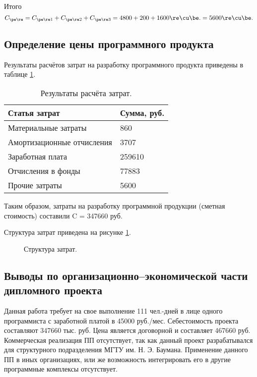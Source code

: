 Итого
\begin{equation*}
    C_{\pe\re} = C_{\pe\re 1} +  C_{\pe\re 2} + C_{\pe\re 3} = 4800 + 200 + 1600 \re\cu\be. = 5600 \re\cu\be.
\end{equation*}

\subsection{Определение цены программного продукта}
Результаты расчётов затрат на разработку программного продукта приведены в таблице \ref{tab:cost}.

\begin{table}[H]
    \caption{\label{tab:cost}Результаты расчёта затрат.}
    \begin{tabular}[H]{|l|l|}
        \hline
        Статья затрат & Сумма, руб.\\
        \hline
        Материальные затраты & 860\\
        \hline
        Амортизационные отчисления & 3707\\
        \hline
        Заработная плата & 259610\\
        \hline
        Отчисления в фонды & 77883\\
        \hline
        Прочие затраты & 5600\\
        \hline
    \end{tabular}
\end{table}

Таким образом, затраты на разработку программной продукции (сметная стоимость) составили C = 347660 руб.

Структура затрат приведена на рисунке \ref{img:cost-structure}.
\begin{figure}[H]
    \caption{Структура затрат.}
    \label{img:cost-structure}
\end{figure}

\subsection{Выводы по организационно–экономической части дипломного проекта}
Данная работа требует на свое выполнение 111 чел.-дней в лице одного программиста с заработной платой в 45000 руб./мес. Себестоимость проекта составляют 347660 тыс. руб. Цена является договорной и составляет 467660 руб.
Коммерческая реализация ПП отсутствует, так как данный проект разрабатывался для структурного подразделения МГТУ им. Н. Э. Баумана. Применение данного ПП в иных организациях, или же возможность интегрировать его в другие программные комплексы отсутствует.
